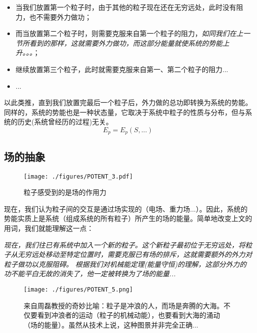 \begin{itemize}
\item 当我们放置第一个粒子时，由于其他的粒子现在还在无穷远处，此时没有阻力，也不需要外力做功；
\item 而当放置第二个粒子时，则需要克服来自第一个粒子的阻力，\textsl{如同我们在上一节所看到的那样，这就需要外力做功，而这部分能量就使系统的势能上升。。。}；
\item 继续放置第三个粒子，此时就需要克服来自第一、第二个粒子的阻力...
\item ...
\end{itemize}
以此类推，直到我们放置完最后一个粒子后，外力做的总功即转换为系统的势能。
同样的，系统的势能也是一种状态量，它取决于系统中粒子的性质与分布，但与系统的历史(系统曾经历的过程)无关。
$$E_p=E_p(S,...)$$

\subsection{场的抽象}
\begin{figure}[ht]
\centering
\texttt{[image: ./figures/POTENT\_3.pdf]}
\caption{粒子感受到的是场的作用力} \label{POTENT_fig3}
\end{figure}
现在，我们认为粒子间的交互是通过场实现的（电场、重力场...）。因此，系统的势能实质上是系统（组成系统的所有粒子）所产生的场的能量。简单地改变上文的用词，我们就能理解这一点：

\textsl{现在，我们往已有系统中加入一个新的粒子。这个新粒子最初位于无穷远处，将粒子从无穷远处移动至特定位置时，需要克服已有场的排斥，这就需要额外的外力对粒子做功以克服阻碍。 根据我们对机械能定理(能量守恒)的理解，这部分外力的功不能平白无故的消失了，他一定被转换为了场的能量...}

\begin{figure}[ht]
\centering
\texttt{[image: ./figures/POTENT\_5.png]}
\caption{来自周磊教授的奇妙比喻：粒子是冲浪的人，而场是奔腾的大海。不仅要看到冲浪者的运动（粒子的机械动能），也要看到大海的涌动（场的能量）。虽然从技术上说，这种图景并非完全正确...} \label{POTENT_fig5}
\end{figure}

